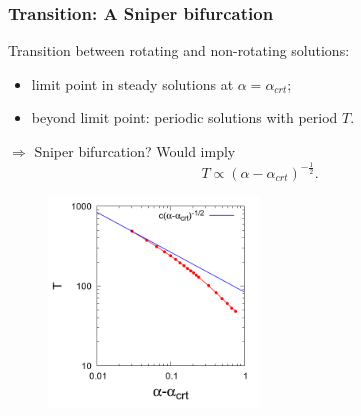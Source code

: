 \documentclass{beamer}
\newcommand{\bi}{\begin{itemize}}
\newcommand{\ei}{\end{itemize}}
\begin{document}
\begin{frame}
	\frametitle{Transition: A Sniper bifurcation}
	\begin{overlayarea}{\textwidth}{\textheight}
		\vspace{-0.5cm} 
		Transition between rotating and non-rotating solutions:
		\bi
		\item limit point in steady solutions at $\alpha=\alpha_{crt}$;
		\item beyond limit point: periodic solutions with period $T$.
		\ei
		$\Rightarrow$ Sniper bifurcation? Would imply 
		\vspace{-0.35cm} 
		\begin{equation*}
			T\propto (\alpha-\alpha_{crt})^{-\frac{1}{2}}.	
		\end{equation*}
		\vspace{-1cm}			
			\begin{figure}[htb]
			\begin{center}
				\includegraphics[width=0.5\textwidth]{plots/I_0.0003000_q_0.300_initial_-4.80_element_20_T_alpha_plot_new.png}
			\end{center}
		\end{figure}\vspace{-4.5cm} 
	{\fontsize{60}{1}\selectfont \textcolor{red}{\checkmark}}
	\end{overlayarea}
\end{frame}


\end{document}
